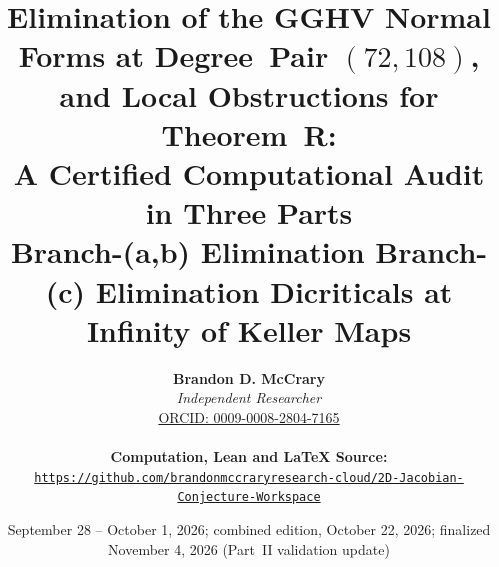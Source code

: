 \documentclass[a4paper,11pt]{article}
\theoremstyle{plain}
\theoremstyle{definition}
\theoremstyle{remark}
\begin{document}
\title{\textbf{\Large Elimination of the GGHV Normal Forms at Degree~Pair $(72,108)$, and Local Obstructions for Theorem~R:}\\[0.6em]
\large A Certified Computational Audit in Three Parts\\[0.4em]
\normalsize Branch-(a,b) Elimination \textperiodcentered{} Branch-(c) Elimination \textperiodcentered{} Dicriticals at Infinity of Keller Maps}
\author{\textbf{Brandon D. McCrary}\\[0.25em]
\textit{Independent Researcher}\\[0.25em]
\href{https://orcid.org/0009-0008-2804-7165}{ORCID: 0009-0008-2804-7165}\\[0.6em]
{\small \parbox{0.92\textwidth}{\centering \textbf{Computation, Lean and LaTeX Source:}\\
{\color{neonmagenta}\hypersetup{urlcolor=neonmagenta}\href{https://github.com/brandonmccraryresearch-cloud/2D-Jacobian-Conjecture-Workspace}{\nolinkurl{https://github.com/brandonmccraryresearch-cloud/2D-Jacobian-Conjecture-Workspace}}}}}}
\date{September 28 -- October 1, 2026; combined edition, October 22, 2026; finalized November 4, 2026 (Part~II validation update)}
\maketitle
\end{document}
